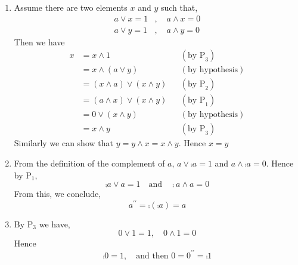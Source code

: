 \begin{myproof}
    \noindent
    \begin{enumerate}
        \item Assume there are two elements \(x\) and \(y\) such that,
        \begin{align*}
            a\vee x=1&,\quad a\wedge x=0\\
            a\vee y=1&,\quad a\wedge y=0
        \end{align*}
        Then we have 
        \begin{align*}
            x&=x\wedge 1 && (\text{by P}_3)\\
            &=x\wedge(a\vee y) && (\text{by hypothesis})\\
            &=(x\wedge a)\vee(x\wedge y) &&(\text{by P}_2) \\
            &=(a\wedge x)\vee(x\wedge y) && (\text{by P}_1)\\
            &=0\vee(x\wedge y ) &&(\text{by hypothesis}) \\
            &=x\wedge y && (\text{by P}_3)
        \end{align*}
        Similarly we can show that \(y=y\wedge x=x\wedge y\). Hence \(x=y\)

        \item From the definition of the complement of \(a\), \(a\vee\comp{a}=1\) and \(a\wedge\comp{a}=0\). Hence by \(\mathrm{P_1}\),
        \[
        \comp{a}\vee a=1\quad\text{and}\quad \comp{a}\wedge a=0
        \]
        From this, we conclude,
        \[
        a^{\prime\prime}=\comp{(\comp{a})}=a
        \]

        \item By \(\mathrm{P_3}\) we have,
        \[
        0\vee 1=1,\quad 0\wedge 1=0
        \]
        Hence 
        \[
        \comp{0}=1,\quad\text{and then } 0=0^{\prime\prime}=\comp{1}
        \]


\end{enumerate}
\end{myproof}
